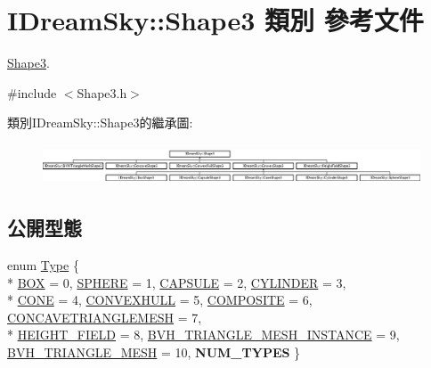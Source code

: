 \hypertarget{class_i_dream_sky_1_1_shape3}{}\section{I\+Dream\+Sky\+:\+:Shape3 類別 參考文件}
\label{class_i_dream_sky_1_1_shape3}


\hyperlink{class_i_dream_sky_1_1_shape3}{Shape3}.  




{\ttfamily \#include $<$Shape3.\+h$>$}

類別\+I\+Dream\+Sky\+:\+:Shape3的繼承圖\+:\begin{figure}[H]
\begin{center}
\leavevmode
\includegraphics[height=1.201717cm]{class_i_dream_sky_1_1_shape3}
\end{center}
\end{figure}
\subsection*{公開型態}
\begin{DoxyCompactItemize}
\item 
enum \hyperlink{class_i_dream_sky_1_1_shape3_afabf580a0794194e29eb14495ead7ae9}{Type} \{ \\*
\hyperlink{class_i_dream_sky_1_1_shape3_afabf580a0794194e29eb14495ead7ae9a8ee3e773c81f976c635cec5377e17136}{B\+OX} = 0, 
\hyperlink{class_i_dream_sky_1_1_shape3_afabf580a0794194e29eb14495ead7ae9a9b64cf54550a6cd565ba13c9a3c335db}{S\+P\+H\+E\+RE} = 1, 
\hyperlink{class_i_dream_sky_1_1_shape3_afabf580a0794194e29eb14495ead7ae9ace2c9d4b0a1cd5556de602f7e6e4520a}{C\+A\+P\+S\+U\+LE} = 2, 
\hyperlink{class_i_dream_sky_1_1_shape3_afabf580a0794194e29eb14495ead7ae9a9b6e143a0da04ab7b5e817f365901c96}{C\+Y\+L\+I\+N\+D\+ER} = 3, 
\\*
\hyperlink{class_i_dream_sky_1_1_shape3_afabf580a0794194e29eb14495ead7ae9a7bac9e2a8bb6479b1085b83e20365ff7}{C\+O\+NE} = 4, 
\hyperlink{class_i_dream_sky_1_1_shape3_afabf580a0794194e29eb14495ead7ae9a90db8635a4aa82944421a90c2e4bf8b6}{C\+O\+N\+V\+E\+X\+H\+U\+LL} = 5, 
\hyperlink{class_i_dream_sky_1_1_shape3_afabf580a0794194e29eb14495ead7ae9afd2cdb489b17dae8b9723eb7af9cb6d7}{C\+O\+M\+P\+O\+S\+I\+TE} = 6, 
\hyperlink{class_i_dream_sky_1_1_shape3_afabf580a0794194e29eb14495ead7ae9a8a76196655d020a820c3898c9c57d172}{C\+O\+N\+C\+A\+V\+E\+T\+R\+I\+A\+N\+G\+L\+E\+M\+E\+SH} = 7, 
\\*
\hyperlink{class_i_dream_sky_1_1_shape3_afabf580a0794194e29eb14495ead7ae9a5586bd5dddddd5e5481a243693947fb7}{H\+E\+I\+G\+H\+T\+\_\+\+F\+I\+E\+LD} = 8, 
\hyperlink{class_i_dream_sky_1_1_shape3_afabf580a0794194e29eb14495ead7ae9a5965ac65a45af9d4f7a4f85811c080bc}{B\+V\+H\+\_\+\+T\+R\+I\+A\+N\+G\+L\+E\+\_\+\+M\+E\+S\+H\+\_\+\+I\+N\+S\+T\+A\+N\+CE} = 9, 
\hyperlink{class_i_dream_sky_1_1_shape3_afabf580a0794194e29eb14495ead7ae9a191eb365f4cddc309f5e2ae2cc6c7677}{B\+V\+H\+\_\+\+T\+R\+I\+A\+N\+G\+L\+E\+\_\+\+M\+E\+SH} = 10, 
{\bfseries N\+U\+M\+\_\+\+T\+Y\+P\+ES}
 \}
\end{DoxyCompactItemize}
